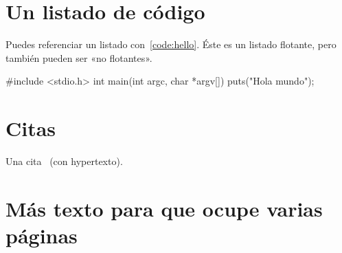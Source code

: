 \section{Un listado de código}

Puedes referenciar un listado con~\ref{code:hello}. Éste es un listado flotante,
pero también pueden ser «no flotantes».

\begin{listing}[
  float,
  language = C,
  caption  = {Hola mundo en C},
  label    = code:hello]
#include <stdio.h>
int main(int argc, char *argv[]) {
    puts("Hola mundo\n");
}
\end{listing}


\section{Citas}

Una cita~\cite{design_patterns} (con hypertexto).



\section{Más texto para que ocupe varias páginas}





